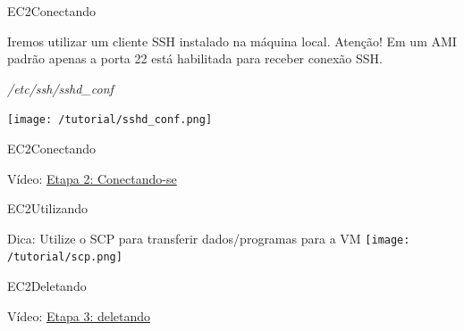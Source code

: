 \documentclass[xcolor=table]{beamer}
\begin{document}
\begin{frame}[c]{EC2}{Conectando}
        \begin{center}
            \begin{outline}                
                \1 Iremos utilizar um cliente SSH instalado na máquina local.
                \1 Atenção! Em um AMI padrão apenas a porta 22 está habilitada para receber conexão SSH.
            \end{outline}
        \end{center}
        \begin{center}
        
            \textit{/etc/ssh/sshd\_conf}
            
            \texttt{[image: /tutorial/sshd\_conf.png]}
        \end{center}

\end{frame}


\begin{frame}[c]{EC2}{Conectando}

        \begin{center}
            Vídeo: \href{run:./2_connecting.ogv}{Etapa 2: Conectando-se}
        \end{center}
      
\end{frame}



\begin{frame}[c]{EC2}{Utilizando}


        \begin{center}
            

            \begin{outline}
            \1[] Dica:
            \2[] Utilize o SCP para transferir dados/programas para a VM 
            \2[] \texttt{[image: /tutorial/scp.png]}
            
            \end{outline}
        \end{center}      
\end{frame}


\begin{frame}[c]{EC2}{Deletando}

        \begin{center}
            Vídeo: \href{run:./4_encerrando.ogv}{Etapa 3: deletando}
        \end{center}
      
\end{frame}
\end{document}
